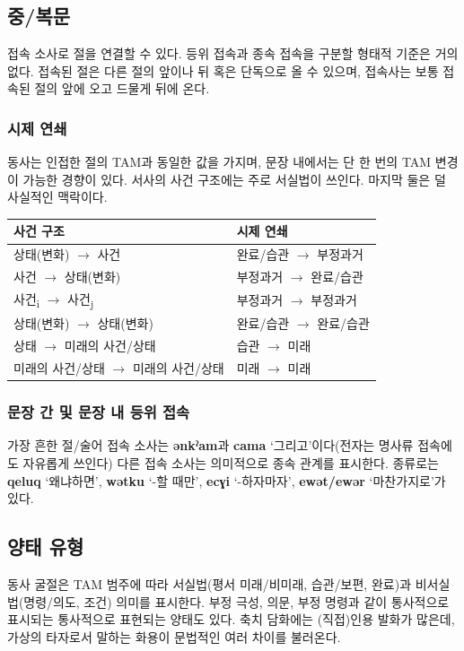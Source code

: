 \subsection{중/복문}
접속 소사로 절을 연결할 수 있다. 등위 접속과 종속 접속을 구분할 형태적 기준은 거의 없다. 접속된 절은 다른 절의 앞이나 뒤 혹은 단독으로 올 수 있으며, 접속사는 보통 접속된 절의 앞에 오고 드물게 뒤에 온다. 
\subsubsection{시제 연쇄}
동사는 인접한 절의 TAM과 동일한 값을 가지며, 문장 내에서는 단 한 번의 TAM 변경이 가능한 경향이 있다. 서사의 사건 구조에는 주로 서실법이 쓰인다. 마지막 둘은 덜 사실적인 맥락이다.
\begin{center}
\begin{tabular}{l|l}
사건 구조	&시제 연쇄\\
\hline
상태(변화) $\rightarrow$ 사건 &완료/습관 $\rightarrow$ 부정과거\\
사건 $\rightarrow$ 상태(변화) &부정과거 $\rightarrow$ 완료/습관\\
사건\textsubscript{i} $\rightarrow$ 사건\textsubscript{j} & 부정과거 $\rightarrow$ 부정과거\\
상태(변화) $\rightarrow$ 상태(변화) &완료/습관 $\rightarrow$ 완료/습관\\
상태 $\rightarrow$ 미래의 사건/상태 & 습관 $\rightarrow$ 미래\\
미래의 사건/상태 $\rightarrow$ 미래의 사건/상태 & 미래 $\rightarrow$ 미래\\
\hline
\end{tabular}
\end{center}
\subsubsection{문장 간 및 문장 내 등위 접속}
가장 흔한 절/술어 접속 소사는 \textbf{ənkˀam}과 \textbf{cama} `그리고'이다(전자는 명사류 접속에도 자유롭게 쓰인다) 다른 접속 소사는 의미적으로 종속 관계를 표시한다. 종류로는 \textbf{qeluq} `왜냐하면', \textbf{wətku} `-할 때만', \textbf{ecɣi} `-하자마자', \textbf{ewət/ewər} `마찬가지로'가 있다.
\subsection{양태 유형}
동사 굴절은 TAM 범주에 따라 서실법(평서 미래/비미래, 습관/보편, 완료)과 비서실법(명령/의도, 조건) 의미를 표시한다. 부정 극성, 의문, 부정 명령과 같이 통사적으로 표시되는 통사적으로 표현되는 양태도 있다. 축치 담화에는 (직접)인용 발화가 많은데, 가상의 타자로서 말하는 화용이 문법적인 여러 차이를 불러온다. 
